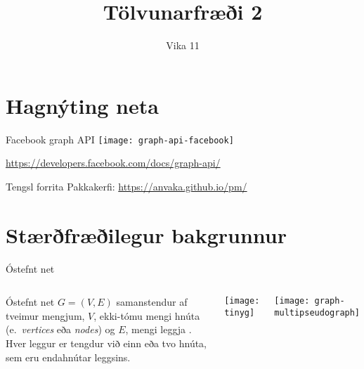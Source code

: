 \documentclass{beamer}
\title{Tölvunarfræði 2}
\subtitle{Vika 11}
\begin{document}
\begin{frame}
	\titlepage
\end{frame}

\section{Hagnýting neta}




\begin{frame}{Facebook graph API}
	\texttt{[image: graph-api-facebook]}

	\begin{center}
		\url{https://developers.facebook.com/docs/graph-api/}
	\end{center}
\end{frame}

\begin{frame}{Tengsl forrita}
	Pakkakerfi: \url{https://anvaka.github.io/pm/}
\end{frame}


\section{Stærðfræðilegur bakgrunnur}

\begin{frame}{Óstefnt net}
	\begin{columns}
		\begin{tcolorbox}[title=Óstefnt net]
			Óstefnt net  $G = (V, E)$ samanstendur af tveimur mengjum, $V$, ekki-tómu mengi hnúta (e.\ \emph{vertices} eða \emph{nodes}) og $E$, mengi leggja . Hver leggur er tengdur við einn eða tvo hnúta, sem eru endahnútar  leggsins.
		\end{tcolorbox}
		\texttt{[image: tinyg]}

		\begin{center}
			\texttt{[image: graph-multipseudograph]}
		\end{center}
	\end{columns}
\end{frame}
\end{document}
